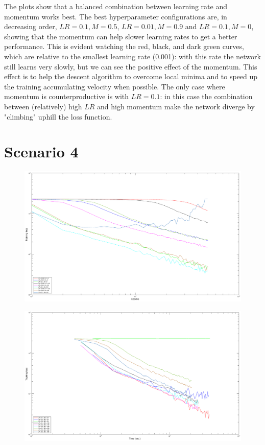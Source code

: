 \documentclass{article}
\begin{document}
    The plots show that a balanced combination between learning rate and momentum works best. The best hyperparameter configurations are, in decreasing order, $LR = 0.1, M = 0.5$, $LR = 0.01, M = 0.9$ and $LR = 0.1, M = 0$, showing that the momentum can help slower learning rates to get a better performance. This is evident watching the red, black, and dark green curves, which are relative to the smallest learning rate (0.001): with this rate the network still learns very slowly, but we can see the positive effect of the momentum. This effect is to help the descent algorithm to overcome local minima and to speed up the training accumulating velocity when possible.
    The only case where momentum is counterproductive is with $LR = 0.1$: in this case the combination between (relatively) high $LR$ and high momentum make the network diverge by "climbing" uphill the loss function.
    
    
\section*{Scenario 4}
	\begin{figure}[!htb]
        \centering
        \includegraphics[width=\textwidth]{figures/sc3_tr_loss}
    \end{figure}
    \begin{figure}[!htb]
        \centering
        \includegraphics[width=\textwidth]{figures/sc2_tr_loss_time}
    \end{figure}
    
\end{document}
